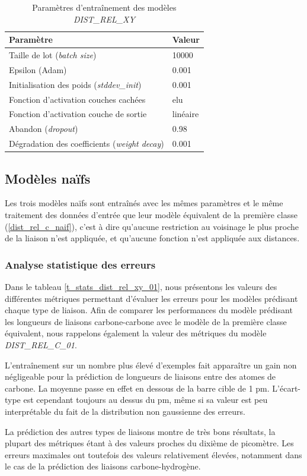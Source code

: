 \begin{table}
	\centering
	\begin{tabular}{|l|l|}
		\hline
		\textbf{Paramètre} & \textbf{Valeur} \\ \hline
		Taille de lot (\emph{batch size}) & 10000 \\ \hline
		Epsilon (Adam) & 0.001 \\ \hline
		Initialisation des poids (\emph{stddev\_init}) & 0.001 \\ \hline
		Fonction d'activation couches cachées & elu \\ \hline
		Fonction d'activation couche de sortie & linéaire \\ \hline
		Abandon (\emph{dropout}) & 0.98 \\ \hline
		Dégradation des coefficients (\emph{weight decay}) & 0.001 \\ \hline
	\end{tabular}

	\caption{Paramètres d'entraînement des modèles \emph{DIST\_REL\_XY}}
	\label{tparams_dist_rel_xy}
\end{table}

\subsection{Modèles naïfs}

\label{dist_rel_xy_naif}

Les trois modèles naïfs sont entraînés avec les mêmes paramètres et le même traitement des données d'entrée que leur modèle équivalent de la première classe (\ref{dist_rel_c_naif}), c'est à dire qu'aucune restriction au voisinage le plus proche de la liaison n'est appliquée, et qu'aucune fonction n'est appliquée aux distances.

\subsubsection{Analyse statistique des erreurs}
\par Dans le tableau \ref{t_stats_dist_rel_xy_01}, nous présentons les valeurs des différentes métriques permettant d'évaluer les erreurs pour les modèles prédisant chaque type de liaison. Afin de comparer les performances du modèle prédisant les longueurs de liaisons carbone-carbone avec le modèle de la première classe équivalent, nous rappelons également la valeur des métriques du modèle \emph{DIST\_REL\_C\_01}.
\par L'entraînement sur un nombre plus élevé d'exemples fait apparaître un gain non négligeable pour la prédiction de longueurs de liaisons entre des atomes de carbone. La moyenne passe en effet en dessous de la barre cible de 1 pm. L'écart-type est cependant toujours au dessus du pm, même si sa valeur est peu interprétable du fait de la distribution non gaussienne des erreurs.
\par La prédiction des autres types de liaisons montre de très bons résultats, la plupart des métriques étant à des valeurs proches du dixième de picomètre. Les erreurs maximales ont toutefois des valeurs relativement élevées, notamment dans le cas de la prédiction des liaisons carbone-hydrogène.

